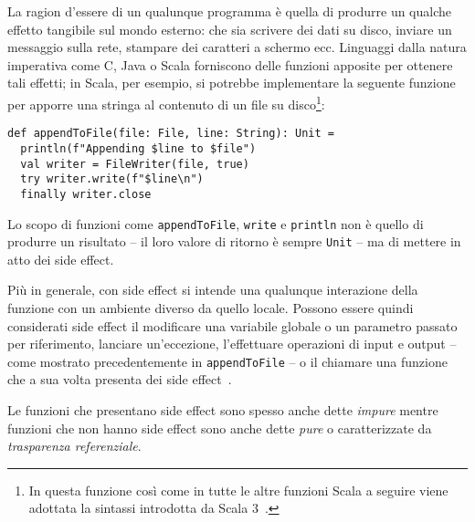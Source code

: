 La ragion d'essere di un qualunque programma è quella di produrre un qualche effetto tangibile sul mondo esterno: che sia scrivere dei dati su disco, inviare un messaggio sulla rete, stampare dei caratteri a schermo ecc.
Linguaggi dalla natura imperativa come C, Java o Scala forniscono delle funzioni apposite per ottenere tali effetti; in Scala, per esempio, si potrebbe implementare la seguente funzione per apporre una stringa al contenuto di un file su disco\footnote{In questa funzione così come in tutte le altre funzioni Scala a seguire viene adottata la sintassi introdotta da Scala 3~\cite{cit:new-in-scala-3}.}:

\begin{lstlisting}[language=scala3]
def appendToFile(file: File, line: String): Unit =
  println(f"Appending $line to $file")
  val writer = FileWriter(file, true)
  try writer.write(f"$line\n")
  finally writer.close
\end{lstlisting}
Lo scopo di funzioni come \lstinline{appendToFile}, \lstinline{write} e \lstinline{println} non è quello di produrre un risultato -- il loro valore di ritorno è sempre \lstinline{Unit} -- ma di mettere in atto dei side effect.

Più in generale, con side effect si intende una qualunque interazione della funzione con un ambiente diverso da quello locale.
Possono essere quindi considerati side effect il modificare una variabile globale o un parametro passato per riferimento, lanciare un'eccezione, l'effettuare operazioni di input e output -- come mostrato precedentemente in \lstinline{appendToFile} -- o il chiamare una funzione che a sua volta presenta dei side effect~\cite{cit:on-the-prevalence-of-function-side-effects-in-general-purpose-open-source-software-systems}.

Le funzioni che presentano side effect sono spesso anche dette \emph{impure} mentre funzioni che non hanno side effect sono anche dette \emph{pure} o caratterizzate da \emph{trasparenza referenziale}.